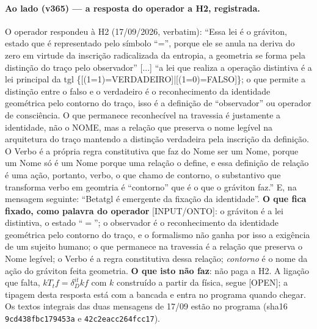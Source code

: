 \documentclass[11pt]{article}
\theoremstyle{definition}\newtheorem{deriv}{Derivação}
\begin{document}
\paragraph*{Ao lado (v365) --- a resposta do operador a H2, registrada.} O operador respondeu à H2 (17/09/2026, verbatim): ``Essa lei é o gráviton, estado que é representado pelo símbolo “=”, porque ele se anula na deriva do zero em virtude da inscrição radicalizada da entropia, a geometria se forma pela distinção do traço pelo observador'' [...] ``a lei que realiza a operação distintiva é a lei principal da tgl \{[(1=1)=VERDADEIRO]|[(1=0)=FALSO]\}; o que permite a distinção entre o falso e o verdadeiro é o reconhecimento da identidade geométrica pelo contorno do traço, isso é a definição de “observador” ou operador de consciência. O que permanece reconhecível na travessia é justamente a identidade, não o NOME, mas a relação que preserva o nome legível na arquitetura do traço mantendo a distinção verdadeira pela inscrição da definição. O Verbo é a própria regra constitutiva que faz do Nome ser um Nome, porque um Nome só é um Nome porque uma relação o define, e essa definição de relação é uma ação, portanto, verbo, o que chamo de contorno, o substantivo que transforma verbo em geomtria é “contorno” que é o que o gráviton faz.'' E, na mensagem seguinte: ``Betatgl é emergente da fixação da identidade''. \textbf{O que fica fixado, como palavra do operador} [INPUT/ONTO]: o gráviton é a lei distintiva, o estado ``$=$''; o observador é o reconhecimento da identidade geométrica pelo contorno do traço, e o formalismo não ganha por isso a exigência de um sujeito humano; o que permanece na travessia é a relação que preserva o Nome legível; o Verbo é a regra constitutiva dessa relação; \emph{contorno} é o nome da ação do gráviton feita geometria. \textbf{O que isto não faz}: não paga a H2. A ligação que falta, $kT_tf=\delta_D^{it}kf$ com $k$ construído a partir da física, segue [OPEN]; a tipagem desta resposta está com a bancada e entra no programa quando chegar. Os textos integrais das duas mensagens de 17/09 estão no programa (sha16 \texttt{9cd438fbc179453a} e \texttt{42c2eacc264fcc17}).
\end{document}
